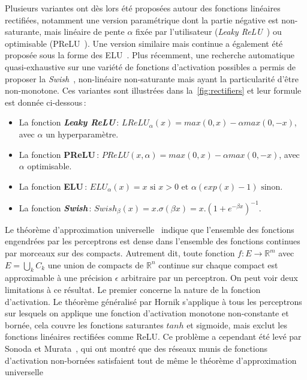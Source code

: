 Plusieurs variantes ont dès lors été proposées autour des fonctions linéaires rectifiées, notamment une version paramétrique dont la partie négative est non-saturante, mais linéaire de pente $\alpha$ fixée par l'utilisateur (\emph{Leaky ReLU}~\cite{maas_rectifier_2013}) ou optimisable (\gls{PReLU}~\cite{he_delving_2015}). Une version similaire mais continue a également été proposée sous la forme des \gls{ELU}~\cite{clevert_fast_2015}. Plus récemment, une recherche automatique quasi-exhaustive sur une variété de fonctions d'activation possibles a permis de proposer la \emph{Swish}~\cite{ramachandran_searching_2018}, non-linéaire non-saturante mais ayant la particularité d'être non-monotone. Ces variantes sont illustrées dans la~\cref{fig:rectifiers} et leur formule est donnée ci-dessous\,:
\begin{itemize}
  \item La fonction \textbf{\emph{Leaky ReLU}}\,: $LReLU_\alpha(x) = max(0,x) - \alpha max(0,-x)$, avec $\alpha$ un hyperparamètre.
  \item La fonction \textbf{\gls{PReLU}}\,: $PReLU(x, \alpha) = max(0,x) - \alpha max(0,-x)$, avec $\alpha$ optimisable.
  \item La fonction \textbf{\gls{ELU}}\,: $ELU_\alpha(x) = x \text{ si } x > 0 \text{ et } \alpha (exp(x) - 1) \text{ sinon}$.
  \item La fonction \textbf{\emph{Swish}}\,: $Swish_\beta(x) = x . \sigma(\beta x) = x . (1 + e^{-\beta x})^{-1}$.
\end{itemize}

Le théorème d'approximation universelle~\cite{cybenko_approximation_1989,hornik_approximation_1991} indique que l'ensemble des fonctions engendrées par les perceptrons est dense dans l'ensemble des fonctions continues par morceaux sur des compacts. Autrement dit, toute fonction $f : E \rightarrow \mathbb{R}^m$ avec $E = \bigcup\limits_{k} C_k$ une union de compacts de $\mathbb{R}^n$ continue sur chaque compact est approximable à une précision $\epsilon$ arbitraire par un perceptron. On peut voir deux limitations à ce résultat. Le premier concerne la nature de la fonction d'activation. Le théorème généralisé par Hornik s'applique à tous les perceptrons sur lesquels on applique une fonction d'activation monotone non-constante et bornée, cela couvre les fonctions saturantes $tanh$ et sigmoide, mais exclut les fonctions linéaires rectifiées comme \gls{ReLU}. Ce problème a cependant été levé par Sonoda et Murata~\cite{sonoda_neural_2017}, qui ont montré que des réseaux munis de fonctions d'activation non-bornées satisfaient tout de même le théorème d'approximation universelle


